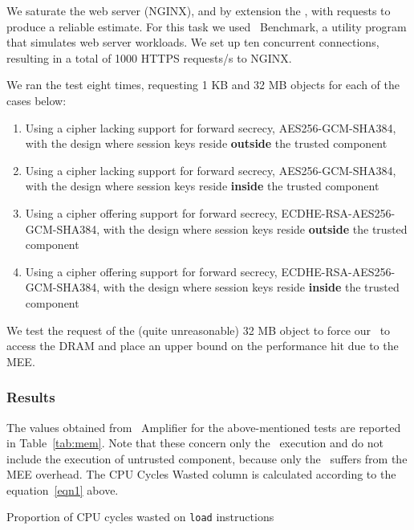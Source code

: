 \documentclass[../../../main.tex]{subfiles}
\begin{document}
We saturate the web server (NGINX), and by extension the \enclavemodel, with
requests to produce a reliable estimate. For this task we used
\Apache~Benchmark, a utility program that simulates web server workloads. We
set up ten concurrent connections, resulting in a total of 1000 HTTPS
requests/s to NGINX.

We ran the test eight times, requesting 1 KB and 32 MB objects for each of the
cases below:
\begin{enumerate}
  \item Using a cipher lacking support for forward secrecy,
    AES256-GCM-SHA384, with the design where session keys reside
    \textbf{outside} the trusted component
  \item Using a cipher lacking support for forward secrecy,
    AES256-GCM-SHA384, with the design where session keys reside
    \textbf{inside} the trusted component
  \item Using a cipher offering support for forward secrecy,
    ECDHE-RSA-AES256-GCM-SHA384, with the design where session keys reside
    \textbf{outside} the trusted component
  \item Using a cipher offering support for forward secrecy,
    ECDHE-RSA-AES256-GCM-SHA384, with the design where session keys reside
    \textbf{inside} the trusted component
\end{enumerate}

We test the request of the (quite unreasonable) 32 MB object to force
our \enclavemodel~to access the DRAM and place an upper bound on the
performance hit due to the MEE.

\subsubsection*{Results}
The values obtained from \VTune~Amplifier for the above-mentioned
tests are reported in Table~\ref{tab:mem}. Note that these concern
only the \enclavemodel~execution and do not include the execution of
untrusted component, because only the \enclaveprogram~suffers from the
MEE overhead. The CPU Cycles Wasted column is calculated according to
the equation~\eqref{eqn1} above.

\begin{table}[H]
  \caption{Proportion of CPU cycles wasted on \texttt{load} instructions}
  \label{tab:mem}
\end{table}
\end{document}
